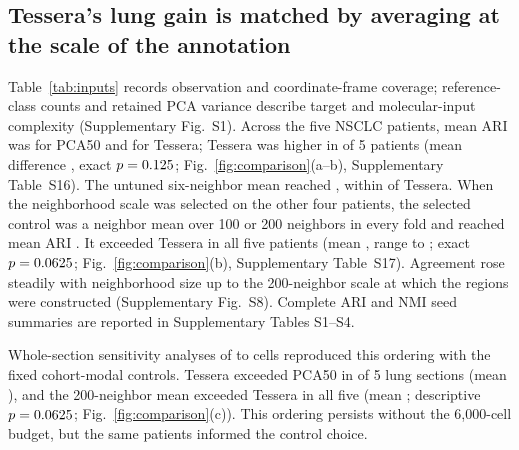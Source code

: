 \documentclass[11pt]{article}
\newcommand{\panelref}[2]{Fig.~\ref{#1}(#2)}
\begin{document}
\subsection{Tessera's lung gain is matched by averaging at the scale of the annotation}
Table~\ref{tab:inputs} records observation and coordinate-frame coverage; reference-class counts and retained PCA variance describe target and molecular-input complexity (Supplementary Fig.~S1). Across the five NSCLC patients, mean ARI was \NsclcPca{} for PCA50 and \NsclcFull{} for Tessera; Tessera was higher in \LungVsPcaPositive{} of 5 patients (mean difference \NsclcDelta{}, exact \(p=0.125{}\); \panelref{fig:comparison}{a--b}, Supplementary Table~S16). The untuned six-neighbor mean reached \NsclcMean{}, within \NsclcVsMean{} of Tessera. When the neighborhood scale was selected on the other four patients, the selected control was a neighbor mean over 100 or 200 neighbors in every fold and reached mean ARI \LungNestedControlMean{}. It exceeded Tessera in all five patients (mean \LungNestedDelta{}, range \LungNestedMin{} to \LungNestedMax{}; exact \(p=0.0625{}\); \panelref{fig:comparison}{b}, Supplementary Table~S17). Agreement rose steadily with neighborhood size up to the 200-neighbor scale at which the regions were constructed (Supplementary Fig.~S8). Complete ARI and NMI seed summaries are reported in Supplementary Tables S1--S4.

Whole-section sensitivity analyses of \WholeCellsMin{} to \WholeCellsMax{} cells reproduced this ordering with the fixed cohort-modal controls. Tessera exceeded PCA50 in \LungWholeVsPcaPositive{} of 5 lung sections (mean \LungWholeVsPcaMean{}), and the 200-neighbor mean exceeded Tessera in all five (mean \LungWholeVsControlMean{}; descriptive \(p=0.0625{}\); \panelref{fig:comparison}{c}). This ordering persists without the 6,000-cell budget, but the same patients informed the control choice.
\end{document}
